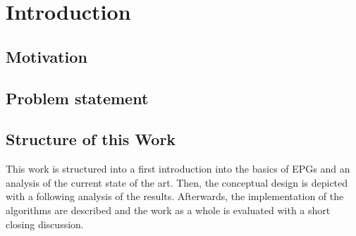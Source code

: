 \chapter{Introduction}
\label{ch:Introduction}
\section{Motivation}
\label{ch:Introduction:sec:Motivation}

\section{Problem statement}
\label{ch:Introduction:sec:Problem statement}


\section{Structure of this Work}
\label{ch:Intoduction:sec:Structure}
\par{
This work is structured into a first introduction into the basics of EPGs and an analysis of the current state of the art. Then, the conceptual design is depicted with a following analysis of the results. Afterwards, the implementation of the algorithms are described and the work as a whole is evaluated with a short closing discussion.  
}
